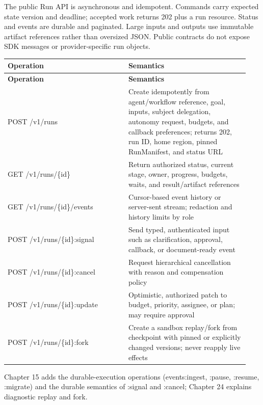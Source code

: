 The public Run API is asynchronous and idempotent. Commands carry expected state version and deadline; accepted work returns 202 plus a run resource. Status and events are durable and paginated. Large inputs and outputs use immutable artifact references rather than oversized JSON. Public contracts do not expose SDK messages or provider-specific run objects.\par

\BookTableStart
\small
\begin{longtable}{@{}Y{0.4700\linewidth}Y{0.4700\linewidth}@{}}
\color{white}\bfseries \textbf{Operation} & \color{white}\bfseries \textbf{Semantics} \\
\endfirsthead
{}
\color{white}\bfseries \textbf{Operation} & \color{white}\bfseries \textbf{Semantics} \\
\endhead
POST /v1/runs & Create idempotently from agent/workflow reference, goal, inputs, subject delegation, autonomy request, budgets, and callback preferences; returns 202, run ID, home region, pinned RunManifest, and status URL \\
GET /v1/runs/\{id\} & Return authorized status, current stage, owner, progress, budgets, waits, and result/artifact references \\
GET /v1/runs/\{id\}/events & Cursor-based event history or server-sent stream; redaction and history limits by role \\
POST /v1/runs/\{id\}:signal & Send typed, authenticated input such as clarification, approval, callback, or document-ready event \\
POST /v1/runs/\{id\}:cancel & Request hierarchical cancellation with reason and compensation policy \\
POST /v1/runs/\{id\}:update & Optimistic, authorized patch to budget, priority, assignee, or plan; may require approval \\
POST /v1/runs/\{id\}:fork & Create a sandbox replay/fork from checkpoint with pinned or explicitly changed versions; never reapply live effects \\
\end{longtable}
\BookTableEnd

Chapter 15 adds the durable-execution operations (events:ingest, :pause, :resume, :migrate) and the durable semantics of :signal and :cancel; Chapter 24 explains diagnostic replay and fork.\par

